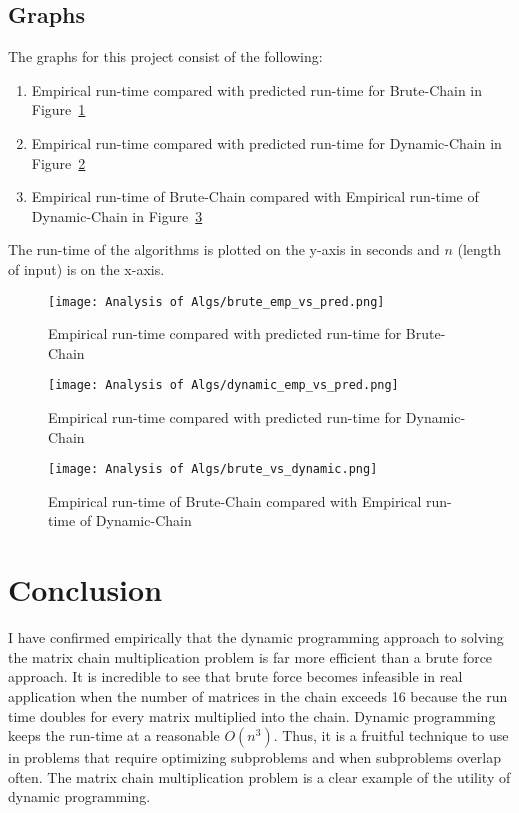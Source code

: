 \documentclass[letterpaper,titlepage]{article}
\begin{document}
\subsection{Graphs}
The graphs for this project consist of the following:
\begin{enumerate}
    \item Empirical run-time compared with predicted run-time for Brute-Chain in Figure~\ref{fig:brute-chain}
    \item Empirical run-time compared with predicted run-time for Dynamic-Chain in Figure~\ref{fig:dynamic-chain}
    \item Empirical run-time of Brute-Chain compared with Empirical run-time of Dynamic-Chain in Figure~\ref{fig:brute_vs_dynamic}
\end{enumerate}
The run-time of the algorithms is plotted on the y-axis in seconds and $n$ (length of input) is on the x-axis.
\begin{figure}
    \texttt{[image: Analysis of Algs/brute\_emp\_vs\_pred.png]}
    \caption{Empirical run-time compared with predicted run-time for Brute-Chain}
    \label{fig:brute-chain}
\end{figure}

\begin{figure}
    \texttt{[image: Analysis of Algs/dynamic\_emp\_vs\_pred.png]} 
    \caption{Empirical run-time compared with predicted run-time for Dynamic-Chain}
    \label{fig:dynamic-chain}
\end{figure}

\begin{figure}
    \texttt{[image: Analysis of Algs/brute\_vs\_dynamic.png]}  
    \caption{Empirical run-time of Brute-Chain compared with Empirical run-time of Dynamic-Chain}
    \label{fig:brute_vs_dynamic}
\end{figure}



\section{Conclusion}
I have confirmed empirically that the dynamic programming approach to solving the matrix chain multiplication problem is far more efficient than a brute force approach. It is incredible to see that brute force becomes infeasible in real application when the number of matrices in the chain exceeds 16 because the run time doubles for every matrix multiplied into the chain. Dynamic programming keeps the run-time at a reasonable $O(n^3)$. Thus, it is a fruitful technique to use in problems that require optimizing subproblems and when subproblems overlap often. The matrix chain multiplication problem is a clear example of the utility of dynamic programming.
\end{document}
